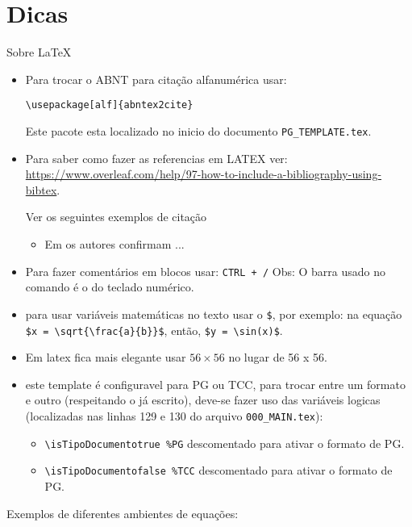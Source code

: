 \section{Dicas}
\label{sec:DicasEscrita}

Sobre \LaTeX
\begin{itemize}
\item 
{}  Para trocar o ABNT para citação alfanumérica usar: 

\verb|\usepackage[alf]{abntex2cite}|

Este pacote esta localizado no inicio do documento \verb|PG_TEMPLATE.tex|.
\item 
{} Para saber como fazer as referencias em LATEX ver: \url{https://www.overleaf.com/help/97-how-to-include-a-bibliography-using-bibtex}.

Ver os seguintes exemplos de citação
\begin{itemize}
\item 
Em  os autores confirmam ...
\end{itemize}
\item 
{} Para fazer comentários em blocos usar: \verb|CTRL + /| Obs: O barra usado no comando é o do teclado numérico.
\item 
{} para usar variáveis matemáticas no texto usar o \verb|$|, por exemplo: na equação \verb|$x = \sqrt{\frac{a}{b}}$|, então, \verb|$y = \sin(x)$|.
\item 
{} Em latex fica mais elegante usar $56 \times 56$ no lugar de 56 x 56.
\item 
{} este template é configuravel para PG ou TCC, para trocar entre um formato e outro (respeitando o já escrito), deve-se fazer uso das variáveis logicas (localizadas nas linhas 129 e 130 do arquivo \verb|000_MAIN.tex|):
\begin{itemize}
\item 
\verb|\isTipoDocumentotrue %PG| descomentado para ativar o formato de PG.
\item 
\verb|\isTipoDocumentofalse %TCC| descomentado para ativar o formato de PG.
\end{itemize}
\end{itemize}

Exemplos de diferentes ambientes de equações:

